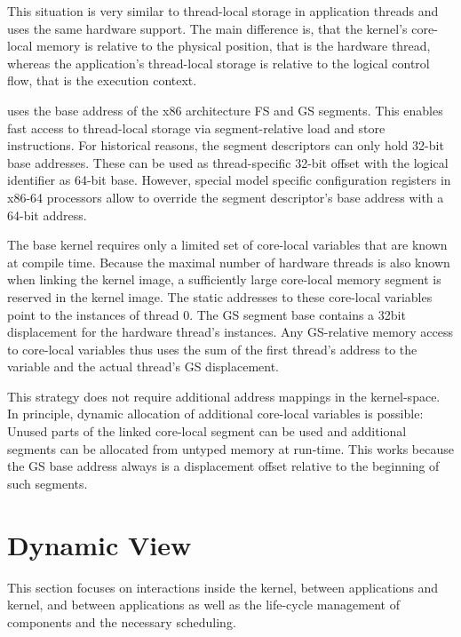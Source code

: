 This situation is very similar to thread-local storage in application threads and uses the same hardware support. The main difference is, that the kernel's core-local memory is relative to the physical position, that is the hardware thread, whereas the application's thread-local storage is relative to the logical control flow, that is the execution context.

\mythos uses the base address of the x86 architecture FS and GS segments. This enables fast access to thread-local storage via segment-relative load and store instructions. For historical reasons, the segment descriptors can only hold 32-bit base addresses. These can be used as thread-specific 32-bit offset with the logical identifier as 64-bit base. However, special model specific configuration registers in x86-64 processors allow to override the segment descriptor's base address with a 64-bit address.

The base kernel requires only a limited set of core-local variables that are known at compile time. Because the maximal number of hardware threads is also known when linking the kernel image, a sufficiently large core-local memory segment is reserved in the kernel image. The static addresses to these core-local variables point to the instances of thread 0. The GS segment base contains a 32bit displacement for the hardware thread's instances. Any GS-relative memory access to core-local variables thus uses the sum of the first thread's address to the variable and the actual thread's GS displacement. 

This strategy does not require additional address mappings in the kernel-space. In principle, dynamic allocation of additional core-local variables is possible: Unused parts of the linked core-local segment can be used and additional segments can be allocated from untyped memory at run-time. This works because the GS base address always is a displacement offset relative to the beginning of such segments.


\section{Dynamic View}
\label{sec:global-dynamical-view}

This section focuses on interactions inside the kernel, between applications and kernel, and between applications as well as the life-cycle management of components and the necessary scheduling.

